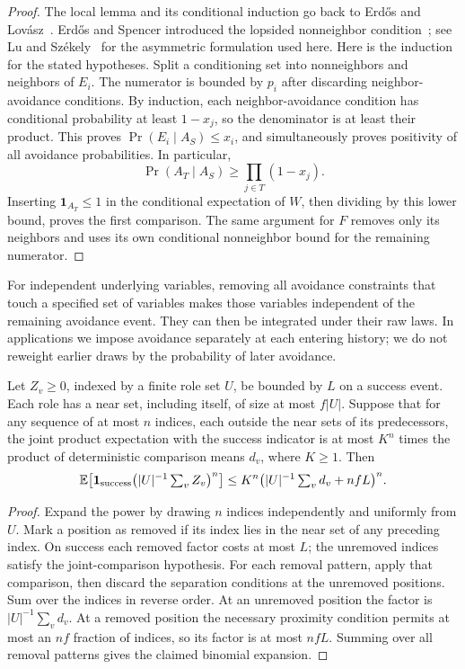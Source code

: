 \begin{proof}
The local lemma and its conditional induction go back to Erd\H{o}s and
Lov\'asz~\cite[Section~2]{erdos-lovasz1975}. Erd\H{o}s and
Spencer introduced the lopsided nonneighbor condition~\cite[Section~1]{erdos-spencer1991};
see Lu and Sz\'ekely~\cite[Lemma~3]{lu-szekely2007} for the asymmetric
formulation used here.
Here is the induction for the stated hypotheses. Split a conditioning
set into nonneighbors and neighbors of \(E_i\). The numerator is bounded
by \(p_i\) after discarding neighbor-avoidance conditions. By induction,
each neighbor-avoidance condition has conditional probability at least
\(1-x_j\), so the denominator is at least their product. This proves
\(\Pr(E_i\mid A_S)\le x_i\), and simultaneously proves positivity of all
avoidance probabilities. In particular,
\[
 \Pr(A_T\mid A_S)\ge\prod_{j\in T}(1-x_j).
\]
Inserting \(\mathbf1_{A_T}\le1\) in the conditional expectation of
\(W\), then dividing by this lower bound, proves the first comparison.
The same argument for \(F\) removes only its neighbors and uses its own
conditional nonneighbor bound for the remaining numerator.
\end{proof}

For independent underlying variables, removing all avoidance constraints
that touch a specified set of variables makes those variables independent
of the remaining avoidance event. They can then be integrated under their
raw laws. In applications we impose avoidance separately at each entering
history; we do not reweight earlier draws by the probability of later
avoidance.

\begin{lemma}\label{lem:scattered-moments}
Let \(Z_v\ge0\), indexed by a finite role set \(U\), be bounded by \(L\)
on a success event. Each role has a near set, including itself, of size at
most \(f|U|\). Suppose that for any sequence of at most \(n\) indices,
each outside the near sets of its predecessors, the joint product
expectation with the success indicator is at most \(K^n\) times the
product of deterministic comparison means \(d_v\), where \(K\ge1\).
Then
\[
 \mathbb E\!\left[\mathbf1_{\rm success}
       \bigl(|U|^{-1}\textstyle\sum_v Z_v\bigr)^n\right]
 \le K^n\bigl(|U|^{-1}\textstyle\sum_v d_v+nfL\bigr)^n.
\]
\end{lemma}

\begin{proof}
Expand the power by drawing \(n\) indices independently and uniformly
from \(U\). Mark a position as removed if its index lies in the near set
of any preceding index. On success each removed factor costs at most
\(L\); the unremoved indices satisfy the joint-comparison hypothesis.
For each removal pattern, apply that comparison, then discard the
separation conditions at the unremoved positions. Sum over the indices
in reverse order. At an unremoved position the factor is
\(|U|^{-1}\sum_v d_v\). At a removed position the necessary proximity
condition permits at most an \(nf\) fraction of indices, so its factor is
at most \(nfL\). Summing over all removal patterns gives the claimed
binomial expansion.
\end{proof}


